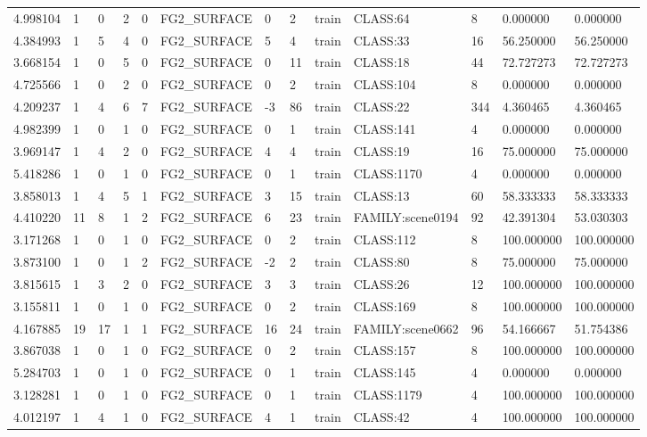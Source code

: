 \begin{tabular}{lllllllllllll}
4.998104 & 1 & 0 & 2 & 0 & FG2\_SURFACE & 0 & 2 & train & CLASS:64 & 8 & 0.000000 & 0.000000 \\
4.384993 & 1 & 5 & 4 & 0 & FG2\_SURFACE & 5 & 4 & train & CLASS:33 & 16 & 56.250000 & 56.250000 \\
3.668154 & 1 & 0 & 5 & 0 & FG2\_SURFACE & 0 & 11 & train & CLASS:18 & 44 & 72.727273 & 72.727273 \\
4.725566 & 1 & 0 & 2 & 0 & FG2\_SURFACE & 0 & 2 & train & CLASS:104 & 8 & 0.000000 & 0.000000 \\
4.209237 & 1 & 4 & 6 & 7 & FG2\_SURFACE & -3 & 86 & train & CLASS:22 & 344 & 4.360465 & 4.360465 \\
4.982399 & 1 & 0 & 1 & 0 & FG2\_SURFACE & 0 & 1 & train & CLASS:141 & 4 & 0.000000 & 0.000000 \\
3.969147 & 1 & 4 & 2 & 0 & FG2\_SURFACE & 4 & 4 & train & CLASS:19 & 16 & 75.000000 & 75.000000 \\
5.418286 & 1 & 0 & 1 & 0 & FG2\_SURFACE & 0 & 1 & train & CLASS:1170 & 4 & 0.000000 & 0.000000 \\
3.858013 & 1 & 4 & 5 & 1 & FG2\_SURFACE & 3 & 15 & train & CLASS:13 & 60 & 58.333333 & 58.333333 \\
4.410220 & 11 & 8 & 1 & 2 & FG2\_SURFACE & 6 & 23 & train & FAMILY:scene0194 & 92 & 42.391304 & 53.030303 \\
3.171268 & 1 & 0 & 1 & 0 & FG2\_SURFACE & 0 & 2 & train & CLASS:112 & 8 & 100.000000 & 100.000000 \\
3.873100 & 1 & 0 & 1 & 2 & FG2\_SURFACE & -2 & 2 & train & CLASS:80 & 8 & 75.000000 & 75.000000 \\
3.815615 & 1 & 3 & 2 & 0 & FG2\_SURFACE & 3 & 3 & train & CLASS:26 & 12 & 100.000000 & 100.000000 \\
3.155811 & 1 & 0 & 1 & 0 & FG2\_SURFACE & 0 & 2 & train & CLASS:169 & 8 & 100.000000 & 100.000000 \\
4.167885 & 19 & 17 & 1 & 1 & FG2\_SURFACE & 16 & 24 & train & FAMILY:scene0662 & 96 & 54.166667 & 51.754386 \\
3.867038 & 1 & 0 & 1 & 0 & FG2\_SURFACE & 0 & 2 & train & CLASS:157 & 8 & 100.000000 & 100.000000 \\
5.284703 & 1 & 0 & 1 & 0 & FG2\_SURFACE & 0 & 1 & train & CLASS:145 & 4 & 0.000000 & 0.000000 \\
3.128281 & 1 & 0 & 1 & 0 & FG2\_SURFACE & 0 & 1 & train & CLASS:1179 & 4 & 100.000000 & 100.000000 \\
4.012197 & 1 & 4 & 1 & 0 & FG2\_SURFACE & 4 & 1 & train & CLASS:42 & 4 & 100.000000 & 100.000000 \\

\end{tabular}
